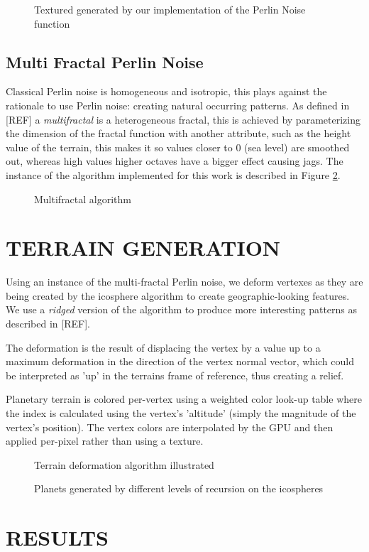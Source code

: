 \documentclass[a4paper,twoside]{article}
\begin{document}
\begin{figure}
\caption{Textured generated by our implementation of the Perlin Noise function}
\label{fig_pn}
\end{figure}

\subsection{Multi Fractal Perlin Noise}
\label{sec:mfpnois}
Classical Perlin noise is homogeneous and isotropic, this plays against the rationale to use Perlin noise: creating natural occurring patterns.  As defined in [REF] a \textit{multifractal} is a heterogeneous fractal, this is achieved by parameterizing the dimension of the fractal function with another attribute, such as the height value of the terrain, this makes it so values closer to 0 (sea level) are smoothed out, whereas high values higher octaves have a bigger effect causing jags. The instance of the algorithm implemented for this work is described in Figure \ref{fig_mf}.

\begin{figure}
\caption{Multifractal algorithm}
\label{fig_mf}
\end{figure}

\section{\uppercase{Terrain Generation}}
\label{sec:tgeneration}

\noindent Using an instance of the multi-fractal Perlin noise, we deform vertexes as they are being created by the icosphere algorithm to create geographic-looking features. We use a \textit{ridged} version of the algorithm to produce more interesting patterns as described in [REF].

The deformation is the result of displacing the vertex by a value up to a maximum deformation in the direction of the vertex normal vector, which could be interpreted as 'up' in the terrains frame of reference, thus creating a relief.

Planetary terrain is colored per-vertex using a weighted color look-up table where the index is calculated using the vertex's 'altitude' (simply the magnitude of the vertex's position). The vertex colors are interpolated by the GPU and then applied per-pixel rather than using a texture.

\begin{figure}
\caption{Terrain deformation algorithm illustrated}
\label{fig_tda}
\end{figure}

\begin{figure}
\caption{Planets generated by different levels of recursion on the icospheres}
\label{fig_iterations}
\end{figure}

\section{\uppercase{Results}}
\label{sec:results}

\vfill
\end{document}
